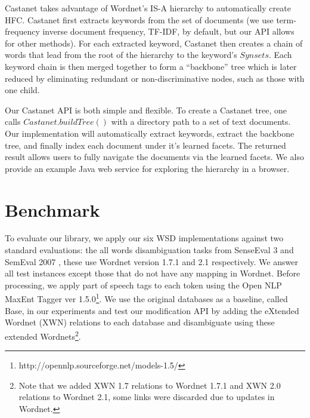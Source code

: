 \documentclass[a4paper,11pt]{article}
\begin{document}
Castanet takes advantage of Wordnet’s IS-A hierarchy to automatically create HFC. Castanet first extracts keywords from the set of documents (we use term-frequency inverse document frequency, TF-IDF, by default, but our API allows for other methods). For each extracted keyword, Castanet then creates a chain of words that lead from the root of the hierarchy to the keyword's $Synsets$. Each keyword chain is then merged together to form a ``backbone'' tree which is later reduced by eliminating redundant or non-discriminative nodes, such as those with one child.

Our Castanet API is both simple and flexible. To create a Castanet tree, one calls $Castanet.buildTree()$ with a directory path to a set of text documents.  Our implementation will automatically extract keywords, extract the backbone tree, and finally index each document under it's learned facets.  The returned result allows users to fully navigate the documents via the learned facets.  We also provide an example Java web service for exploring the hierarchy in a browser.

\section{Benchmark}

To evaluate our library, we apply our six WSD implementations against two standard evaluations: the all words disambiguation tasks from SenseEval 3 \cite{snyder-palmer:2004:Senseval-3} and SemEval 2007 \cite{pradhan07semeval}, these use Wordnet version 1.7.1 and 2.1 respectively.  We answer all test instances except those that do not have any mapping in Wordnet.  Before processing, we apply part of speech tags to each token using the Open NLP MaxEnt Tagger ver 1.5.0\footnote{http://opennlp.sourceforge.net/models-1.5/}.   We use the original databases as a baseline, called Base, in our experiments and test our modification API by adding the eXtended Wordnet (XWN) relations \cite{mihalcea01extendedwordnet} to each database and disambiguate using these extended Wordnets\footnote{Note that we added XWN 1.7 relations to Wordnet 1.7.1 and XWN 2.0 relations to Wordnet 2.1, some links were discarded due to updates in Wordnet.}.
\end{document}
